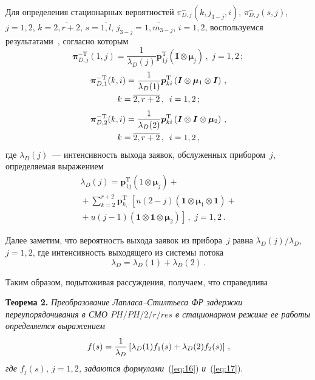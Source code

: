 \begin{multicols}{2}
Для определения стационарных вероятностей $\pi_{D,j}^{-}(k,j_{3-j},i)$, $\pi_{D,j}^{-}(s,j)$, 
$j=1,2$, $k=\overline{2,r+2}$, $s=\overline{1,l}$, $j_{3-j}=\overline{1,m_{3-j}}$, $i=1,2$, 
воспользуемся результатами~\cite{4mat}, согласно которым
\begin{equation}
\label{eq:18}
\boldsymbol{\pi}_{D,j}^{-\mathrm{T}}(1,j)=\frac{1}{\lambda_{D}(j)}\boldsymbol{p}_{1j}^{\mathrm{T}}
\left(\boldsymbol{I}\otimes\boldsymbol{\mu}_j\right)\,,\,\, j=1,2\,;
\end{equation}
\begin{multline}
\label{eq:19}
\boldsymbol{\pi}_{D,1}^{-\mathrm{T}}(k,i)=\frac{1}{\lambda_{D}(1)}\boldsymbol{p}_{ki}^{\mathrm{T}}
\left(\boldsymbol{I}\otimes\boldsymbol{\mu}_1\otimes\boldsymbol{I}\right)\,,\\
k=\overline{2,r+2}\,,\enskip i=1,2\,;
\end{multline}
\begin{multline}
\label{eq:20}
\boldsymbol{\pi}_{D,2}^{-\mathrm{T}}(k,i)=\frac{1}{\lambda_{D}(2)}\boldsymbol{p}_{ki}^{\mathrm{T}}
\left(\boldsymbol{I}\otimes\boldsymbol{I}\otimes\boldsymbol{\mu}_2\right)\,,\\
 k=\overline{2,r+2}\,,\enskip i=1,2\,,
\end{multline}
где $\lambda_{D}(j)$~--- интенсивность выхода заявок, обслуженных прибором~$j$, определяемая выражением
\begin{multline*}
\lambda_{D}(j)=\boldsymbol{p}_{1j}^{\mathrm{T}}\left(1\otimes\boldsymbol{\mu}_j\right)+{}\\
{}+\sum\limits_{k=2}^{r+2}\boldsymbol{p}_{k,\cdot}^{\mathrm{T}}
\left[u(2-j)(\boldsymbol{1}\otimes\boldsymbol{\mu}_1\otimes\boldsymbol{1})+{}\right.\\
\left.{}+
u(j-1)(\boldsymbol{1}\otimes\boldsymbol{1}\otimes\boldsymbol{\mu}_2)\right]\,,\,\,
j=1,2\,.
\end{multline*}

Далее заметим, что вероятность выхода заявок из прибора~$j$ равна $\lambda_{D}(j)/\lambda_{D}$, $j=1,2$, 
где интенсивность выходящего из системы потока
\begin{equation*}
\lambda_D=\lambda_D(1)+\lambda_D(2)\,.
\end{equation*}

Таким образом, подытоживая рассуждения, получаем, что справедлива

\smallskip

\noindent
\textbf{Теорема 2.} \textit{Преобразование Лапласа--Стилтьеса ФР задержки переупорядочивания в СМО $PH/PH/2/r/res$ в стационарном режиме 
ее работы определяется выражением
\begin{equation*}
f(s)=\displaystyle\frac{\displaystyle 1\mathstrut}{\displaystyle \lambda_D\mathstrut}\left[\lambda_D(1)f_1(s)+\lambda_D(2)f_2(s)\right]\,,
\end{equation*}
где $f_j(s)$, $j=1,2$, задаются формулами}~(\ref{eq:16}) \textit{и}~(\ref{eq:17}).


\end{multicols}
